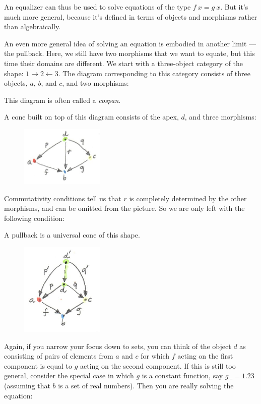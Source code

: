 \noindent
An equalizer can thus be used to solve equations of the type
$f~x = g~x$. But it's much more general, because it's defined
in terms of objects and morphisms rather than algebraically.

An even more general idea of solving an equation is embodied in another
limit --- the pullback. Here, we still have two morphisms that we want
to equate, but this time their domains are different. We start with a
three-object category of the shape:
$1\rightarrow2\leftarrow3$. The diagram corresponding to
this category consists of three objects, $a$, $b$, and
$c$, and two morphisms:


This diagram is often called a \emph{cospan}.

A cone built on top of this diagram consists of the apex, $d$,
and three morphisms:


\begin{figure}[H]
\centering
\includegraphics[width=40mm]{images/pullbackcone.jpg}
\end{figure}

\noindent
Commutativity conditions tell us that $r$ is completely
determined by the other morphisms, and can be omitted from the picture.
So we are only left with the following condition:

A pullback is a universal cone of this shape.

\begin{figure}[H]
\centering
\includegraphics[width=40mm]{images/pullbacklimit.jpg}
\end{figure}

\noindent
Again, if you narrow your focus down to sets, you can think of the
object $d$ as consisting of pairs of elements from $a$ and
$c$ for which $f$ acting on the first component is equal
to $g$ acting on the second component. If this is still too
general, consider the special case in which $g$ is a constant
function, say $g~\_ = 1.23$ (assuming that $b$ is a set
of real numbers). Then you are really solving the equation:

